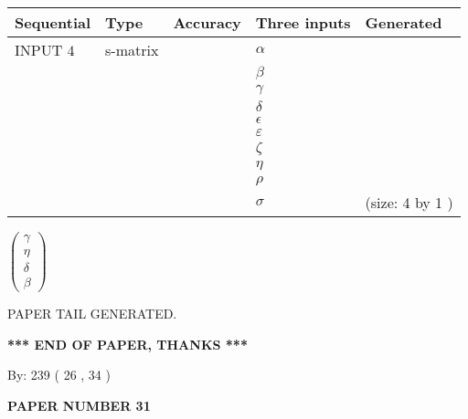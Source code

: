 \documentclass[12pt]{article}
\begin{document}
  
\noindent\begin{tabular}{|l|l|l|l|l|}
\hline
 Sequential & Type & Accuracy & Three inputs & Generated \\ 
\hline
 
 
  INPUT $  4 $ & s-matrix & & 
 $  \alpha $ & 
  \\
  & & & 
 $  \beta $ & 
  \\
  & & & 
 $  \gamma $ & 
  \\
  & & & 
 $  \delta $ & 
  \\
  & & & 
 $  \epsilon $ & 
  \\
  & & & 
 $  \varepsilon $ & 
  \\
  & & & 
 $                     \zeta $ & 
  \\
  & & & 
 $  \eta $ & 
  \\
  & & & 
 $  \rho $ & 
  \\
  & & & 
 $  \sigma $ & 
  (size:  4  by  1 )
 \\  \hline  
 \end{tabular}
   
   
 $  \left( \begin{array}
 {
 c
 }
 \gamma \\ 
 \eta \\ 
 \delta \\ 
 \beta
 \end{array} \right) $ 
   
   
   
   
 \vspace{0.2in}
 
   
   
\vspace{2.0in} PAPER TAIL GENERATED.
   
   
   
   
\vspace{1.0in} 
{\textbf{\large{ *** END OF PAPER, THANKS *** }}} 
   
   
\hspace{1.0in} By: 
 239 ( 26 ,  34 )
   
   
   
   
\newpage 
\setcounter{page}{ 
    31001 } 
   
   
   
   
 {\textbf{ \Large{ PAPER NUMBER  31  }}}
   
   
\vspace{0.2in}
   
   
   
\end{document}
